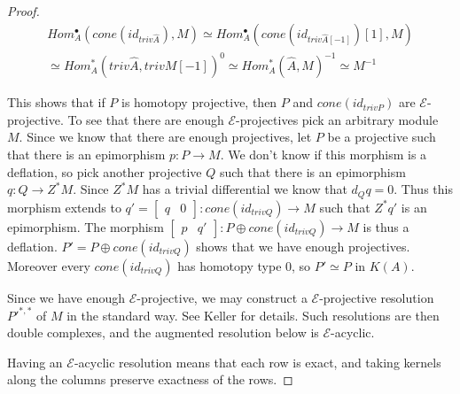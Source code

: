 \documentclass[../thesis.tex]{subfiles}
\begin{document}
\begin{proof}
                \begin{multline*}
                    Hom_A^\bullet (cone(id_{triv\hat{A}}), M) \simeq Hom_A^\bullet (cone(id_{triv\hat{A}[-1]})[1], M) \\ \simeq Hom_A^*(triv\hat{A}, trivM[-1])^0 \simeq Hom_A^*(\hat{A}, M)^{-1} \simeq M^{-1}
                \end{multline*}

                This shows that if $P$ is homotopy projective, then $P$ and $cone(id_{trivP})$ are $\mathcal{E}$-projective. To see that there are enough $\mathcal{E}$-projectives pick an arbitrary module $M$. Since we know that there are enough projectives, let $P$ be a projective such that there is an epimorphism $p : P \rightarrow M$. We don't know if this morphism is a deflation, so pick another projective $Q$ such that there is an epimorphism $q : Q \rightarrow Z^*M$. Since $Z^*M$ has a trivial differential we know that $d_Qq = 0$. Thus this morphism extends to $q' = \begin{bmatrix}
                    q & 0
                \end{bmatrix} : cone(id_{trivQ}) \rightarrow M$ such that $Z^*q'$ is an epimorphism. The morphism $\begin{bmatrix}
                    p & q'
                \end{bmatrix} : P \oplus cone(id_{trivQ}) \rightarrow M$ is thus a deflation. $P' = P \oplus cone(id_{trivQ})$ shows that we have enough projectives. Moreover every $cone(id_{trivQ})$ has homotopy type $0$, so $P' \simeq P$ in $K(A)$.

                Since we have enough $\mathcal{E}$-projective, we may construct a $\mathcal{E}$-projective resolution $P'^{*,*}$ of $M$ in the standard way. See Keller \cite{Keller90} for details. Such resolutions are then double complexes, and the augmented resolution below is $\mathcal{E}$-acyclic.

                \begin{center}
                \end{center} 
                
                Having an $\mathcal{E}$-acyclic resolution means that each row is exact, and taking kernels along the columns preserve exactness of the rows.
                

\end{proof}
\end{document}
